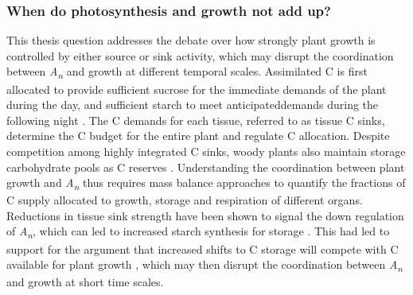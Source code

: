\documentclass[a4paper]{article}\usepackage[]{graphicx}\usepackage[]{color}
\begin{document}
\subsubsection*{When do photosynthesis and growth not add up?}

This thesis question addresses the debate over how strongly plant growth is controlled by either source or sink activity, which may disrupt the coordination between \textit{A\textsubscript{n}} and growth at different temporal scales. Assimilated C is first allocated to provide sufficient sucrose for the immediate demands of the plant during the day, and sufficient starch to meet \textquotesingle anticipated\textquotesingle demands during the following night \citep{smith2007coordination}. The C demands for each tissue, referred to as tissue C sinks, determine the C budget for the entire plant and regulate C allocation. Despite competition among highly integrated C sinks, woody plants also maintain storage carbohydrate pools as C reserves \citep{kozlowski1992carbohydrate}. Understanding the coordination between plant growth and \textit{A\textsubscript{n}} thus requires mass balance approaches to quantify the fractions of C supply allocated to growth, storage and respiration of different organs. Reductions in tissue sink strength have been shown to signal the down regulation of \textit{A\textsubscript{n}}, which can led to increased starch synthesis for storage \citep{sage1994acclimation, kitao2007interaction}. This had led to support for the argument that increased shifts to C storage will compete with C available for plant growth \citep{chapin1990ecology}, which may then disrupt the coordination between \textit{A\textsubscript{n}} and growth at short time scales.
\end{document}
